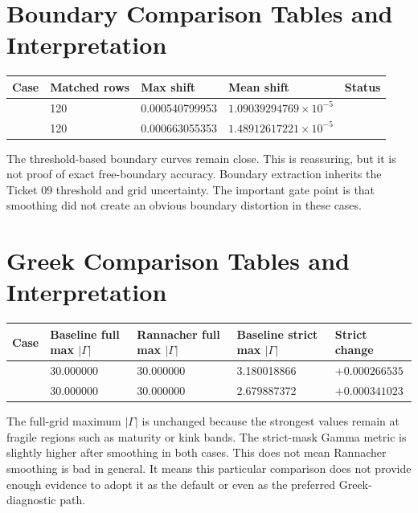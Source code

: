 \documentclass[11pt,a4paper]{article}
\begin{document}
\section{Boundary Comparison Tables and Interpretation}

\begin{longtable}{P{0.28\textwidth}P{0.13\textwidth}P{0.13\textwidth}P{0.13\textwidth}P{0.14\textwidth}}
\toprule
Case & Matched rows & Max shift & Mean shift & Status \\
\midrule
\endhead
{} & 120 & 0.000540799953 & \(1.09039294769\times10^{-5}\) &  \\
 & 120 & 0.000663055353 & \(1.48912617221\times10^{-5}\) &  \\
\bottomrule
\end{longtable}

The threshold-based boundary curves remain close. This is reassuring, but it is not proof of
exact free-boundary accuracy. Boundary extraction inherits the Ticket 09 threshold and grid
uncertainty. The important gate point is that smoothing did not create an obvious boundary
distortion in these cases.

\section{Greek Comparison Tables and Interpretation}

\begin{longtable}{P{0.27\textwidth}P{0.16\textwidth}P{0.16\textwidth}P{0.16\textwidth}P{0.13\textwidth}}
\toprule
Case & Baseline full max \(|\Gamma|\) & Rannacher full max \(|\Gamma|\) & Baseline strict max \(|\Gamma|\) & Strict change \\
\midrule
\endhead
{} & 30.000000 & 30.000000 & 3.180018866 & \(+0.000266535\) \\
 & 30.000000 & 30.000000 & 2.679887372 & \(+0.000341023\) \\
\bottomrule
\end{longtable}

The full-grid maximum \(|\Gamma|\) is unchanged because the strongest values remain at fragile
regions such as maturity or kink bands. The strict-mask Gamma metric is slightly higher after
smoothing in both cases. This does not mean Rannacher smoothing is bad in general. It means this
particular comparison does not provide enough evidence to adopt it as the default or even as the
preferred Greek-diagnostic path.
\end{document}
